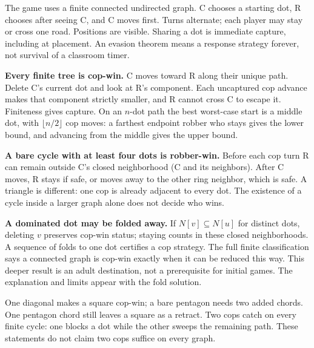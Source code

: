 The game uses a finite connected undirected graph. C chooses a starting dot, R chooses after seeing C, and C moves first. Turns alternate; each player may stay or cross one road. Positions are visible. Sharing a dot is immediate capture, including at placement. An evasion theorem means a response strategy forever, not survival of a classroom timer.

\textbf{Every finite tree is cop-win.} C moves toward R along their unique path. Delete C's current dot and look at R's component. Each uncaptured cop advance makes that component strictly smaller, and R cannot cross C to escape it. Finiteness gives capture. On an $n$-dot path the best worst-case start is a middle dot, with $\lfloor n/2\rfloor$ cop moves: a farthest endpoint robber who stays gives the lower bound, and advancing from the middle gives the upper bound.

\textbf{A bare cycle with at least four dots is robber-win.} Before each cop turn R can remain outside C's closed neighborhood (C and its neighbors). After C moves, R stays if safe, or moves away to the other ring neighbor, which is safe. A triangle is different: one cop is already adjacent to every dot. The existence of a cycle inside a larger graph alone does not decide who wins.

\textbf{A dominated dot may be folded away.} If $N[v]\subseteq N[u]$ for distinct dots, deleting $v$ preserves cop-win status; staying counts in these closed neighborhoods. A sequence of folds to one dot certifies a cop strategy. The full finite classification says a connected graph is cop-win exactly when it can be reduced this way. This deeper result is an adult destination, not a prerequisite for initial games. The explanation and limits appear with the fold solution.

One diagonal makes a square cop-win; a bare pentagon needs two added chords. One pentagon chord still leaves a square as a retract. Two cops catch on every finite cycle: one blocks a dot while the other sweeps the remaining path. These statements do not claim two cops suffice on every graph.
